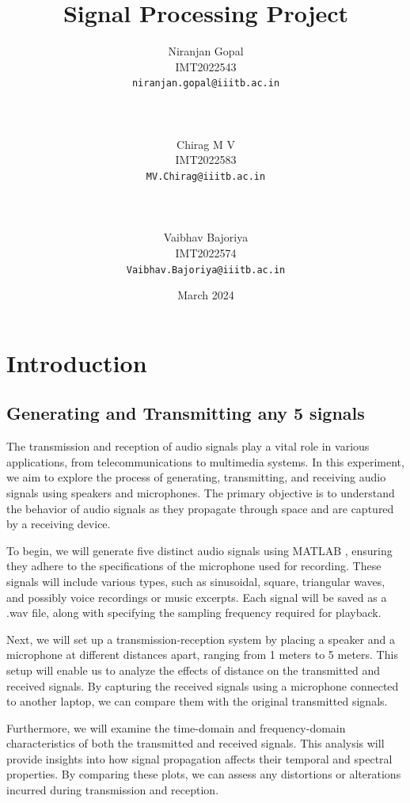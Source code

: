\documentclass{report}
\title{\fontTitle Signal Processing Project  }
\author{
  \Large Niranjan Gopal \\
  \normalsize IMT2022543 \\
  \normalsize \texttt{niranjan.gopal@iiitb.ac.in}
    \\ \\ \\ \\
  \Large Chirag M V\\
  \normalsize IMT2022583 \\
  \normalsize \texttt{MV.Chirag@iiitb.ac.in}
    \\ \\ \\ \\
  \Large Vaibhav Bajoriya \\
  \normalsize IMT2022574 \\
  \normalsize \texttt{Vaibhav.Bajoriya@iiitb.ac.in}
}
\date{ March 2024 }
\begin{document}
\maketitle



\tableofcontents

\chapter{Introduction }



\section{Generating and Transmitting any 5 signals}



The transmission and reception of audio signals play a vital role in various applications, from telecommunications to multimedia systems. In this experiment, we aim to explore the process of generating, transmitting, and receiving audio signals using speakers and microphones. The primary objective is to understand the behavior of audio signals as they propagate through space and are captured by a receiving device.

To begin, we will generate five distinct audio signals using MATLAB , ensuring they adhere to the specifications of the microphone used for recording. These signals will include various types, such as sinusoidal, square, triangular waves, and possibly voice recordings or music excerpts. Each signal will be saved as a .wav file, along with specifying the sampling frequency required for playback.

Next, we will set up a transmission-reception system by placing a speaker and a microphone at different distances apart, ranging from 1 meters to 5 meters. This setup will enable us to analyze the effects of distance on the transmitted and received signals. By capturing the received signals using a microphone connected to another laptop, we can compare them with the original transmitted signals.

Furthermore, we will examine the time-domain and frequency-domain characteristics of both the transmitted and received signals. This analysis will provide insights into how signal propagation affects their temporal and spectral properties. By comparing these plots, we can assess any distortions or alterations incurred during transmission and reception.
\end{document}
